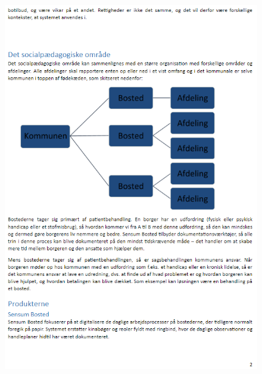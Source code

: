 \begin{figure}[hbt!]
\begin{center}
  \includegraphics[scale = 1]{./PNG/Case/Case_2.png} 
\end{center}
\end{figure}

